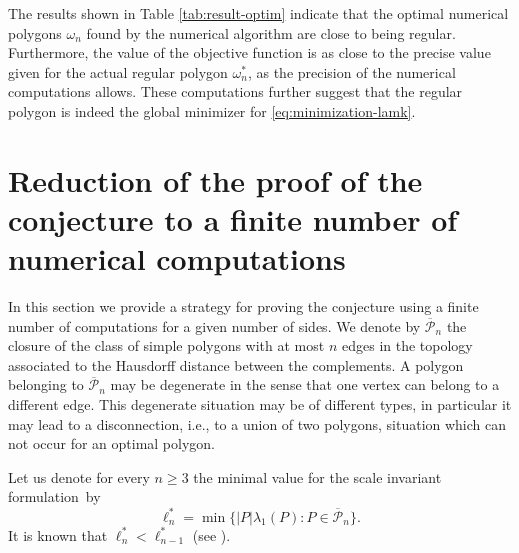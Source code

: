 \documentclass[11pt]{article}
\newcommand{\ie}{i.e.,\xspace}
\numberwithin{equation}{section}\newtheorem*{jepEnonce}{\jepEnonceTitle}\newenvironment{enonce*}[1]{\def\jepEnonceTitle{#1}\jepEnonce}{\endjepEnonce}\newtheorem*{conj*}{Conjecture}
\theoremstyle{plain}
\theoremstyle{definition}
\newcommand{\ov}{\overline}
\begin{document}
The results shown in Table \ref{tab:result-optim} indicate that the optimal numerical polygons $\omega_n$ found by the numerical algorithm are close to being regular. Furthermore, the value of the objective function is as close to the precise value given for the actual regular polygon $\omega_n^*$, as the precision of the numerical computations allows. These computations further suggest that the regular polygon is indeed the global minimizer for \eqref{eq:minimization-lamk}.

\section{Reduction of the proof of the conjecture to a finite number of numerical computations}\label{bobu200}

In this section we provide a strategy for proving the conjecture using a finite number of computations for a given number of sides. We denote by $ \ov { \mathcal P}_n $ the closure of the class of simple polygons with at most $n$ edges in the topology associated to the Hausdorff distance between the complements. A polygon belonging to $ \ov { \mathcal P}_n $ may be degenerate in the sense that one vertex can belong to a different edge. This degenerate situation may be of different types, in particular it may lead to a disconnection, \ie to a union of two polygons, situation which can not occur for an optimal polygon.

Let us denote for every $n \ge 3$ the minimal value for the scale invariant formulation~by
\[
\ell_n^*= \min \{|P|\lambda_1(P) : P \in \ov { \mathcal P}_n \}.
\]
It is known that $\ell_n^* < \ell_{n-1}^*$ (see \cite[\S 3.3]{henroteigs}).
\end{document}
